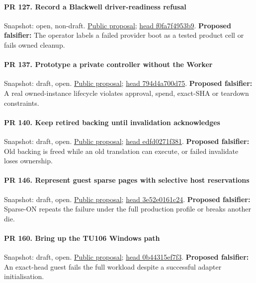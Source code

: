 \paragraph{PR 127. Record a Blackwell driver-readiness refusal}
\readcode Snapshot: open, non-draft.
\href{\repobase/pull/127}{Public proposal};
\href{\repobase/commit/f0fa7f4953b9b6c1d651cbf33a8ddef657919ad3}{head f0fa7f4953b9}.
\textbf{Proposed falsifier:} The operator labels a failed provider boot as a tested product cell or
  fails owned cleanup.

\paragraph{PR 137. Prototype a private controller without the Worker}
\readcode Snapshot: draft, open.
\href{\repobase/pull/137}{Public proposal};
\href{\repobase/commit/794d4a700d752018aedf45a28a0df77792effd2a}{head 794d4a700d75}.
\textbf{Proposed falsifier:} A real owned-instance lifecycle violates approval, spend, exact-SHA or
  teardown constraints.

\paragraph{PR 140. Keep retired backing until invalidation acknowledges}
\readcode Snapshot: draft, open.
\href{\repobase/pull/140}{Public proposal};
\href{\repobase/commit/edfd0271f38111b6ba32b14d7fd6cf78d8deaeb9}{head edfd0271f381}.
\textbf{Proposed falsifier:} Old backing is freed while an old translation can execute, or failed
  invalidate loses ownership.

\paragraph{PR 146. Represent guest sparse pages with selective host reservations}
\readcode Snapshot: draft, open.
\href{\repobase/pull/146}{Public proposal};
\href{\repobase/commit/3e52e0161c24547bf2e68d90e79b07c26a30df6d}{head 3e52e0161c24}.
\textbf{Proposed falsifier:} Sparse-ON repeats the failure under the full production profile or
  breaks another die.

\paragraph{PR 160. Bring up the TU106 Windows path}
\readcode Snapshot: draft, open.
\href{\repobase/pull/160}{Public proposal};
\href{\repobase/commit/0b44315ef7f33dd19f919f2937b07c230e73e37a}{head 0b44315ef7f3}.
\textbf{Proposed falsifier:} An exact-head guest fails the full workload despite a successful
  adapter initialisation.

